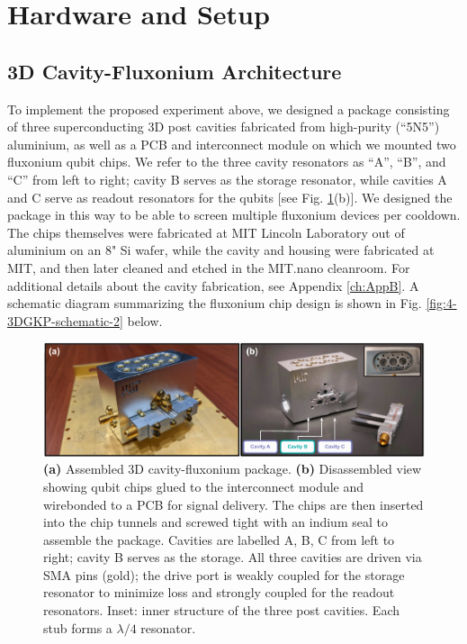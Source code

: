 \clearpage
\section{Hardware and Setup\label{sec:4_Hardware_and_Setup}}

\subsection{3D Cavity-Fluxonium Architecture \label{sec:4_3D_Cavity_Resonators}}
To implement the proposed experiment above, we designed a package consisting of three superconducting 3D post cavities fabricated from high-purity (``5N5'') aluminium, as well as a PCB and interconnect module on which we mounted two fluxonium qubit chips. We refer to the three cavity resonators as ``A'', ``B'', and ``C'' from left to right; cavity B serves as the storage resonator, while cavities A and C serve as readout resonators for the qubits [see Fig. \ref{fig:4-3DGKP-schematic-1}(b)]. We designed the package in this way to be able to screen multiple fluxonium devices per cooldown. The chips themselves were fabricated at MIT Lincoln Laboratory out of aluminium on an 8" Si wafer, while the cavity and housing were fabricated at MIT, and then later cleaned and etched in the MIT.nano cleanroom. For additional details about the cavity fabrication, see Appendix \ref{ch:AppB}. A schematic diagram summarizing the fluxonium chip design is shown in Fig. \ref{fig:4-3DGKP-schematic-2} below.

\begin{figure}[h]
    \centering
    \includegraphics[width=0.95\linewidth]{Figures/4/3DGKP-Schematic-1.pdf}
    \caption[Hardware overview of 3D cavity architecture, showing both the assembled and disassembled packages.]{\textbf{(a)} Assembled 3D cavity-fluxonium package. \textbf{(b)} Disassembled view showing qubit chips glued to the interconnect module and wirebonded to a PCB for signal delivery. The chips are then inserted into the chip tunnels and screwed tight with an indium seal to assemble the package. Cavities are labelled A, B, C from left to right; cavity B serves as the storage. All three cavities are driven via SMA pins (gold); the drive port is weakly coupled for the storage resonator to minimize loss and strongly coupled for the readout resonators. Inset: inner structure of the three post cavities. Each stub forms a $\lambda/4$ resonator.}
    \label{fig:4-3DGKP-schematic-1}
\end{figure}

